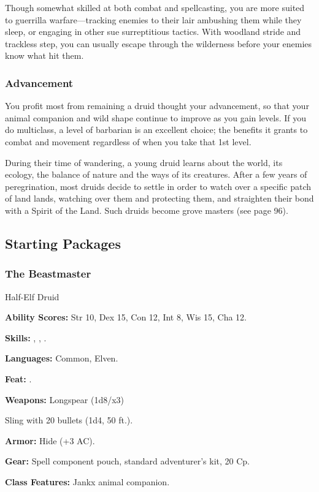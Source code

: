 Though somewhat skilled at both combat and spellcasting, you are more suited to guerrilla warfare---tracking enemies to their lair ambushing them while they sleep, or engaging in other sue surreptitious tactics. With woodland stride and trackless step, you can usually escape through the wilderness before your enemies know what hit them.

\subsubsection{Advancement}

You profit most from remaining a druid thought your advancement, so that your animal companion and wild shape continue to improve as you gain levels. If you do multiclass, a level of barbarian is an excellent choice; the benefits it grants to combat and movement regardless of when you take that 1st level.

During their time of wandering, a young druid learns about the world, its ecology, the balance of nature and the ways of its creatures. After a few years of peregrination, most druids decide to settle in order to watch over a specific patch of land lands, watching over them and protecting them, and straighten their bond with a Spirit of the Land. Such druids become grove masters (see page 96).

\subsection{Starting Packages}
\subsubsection{The Beastmaster}

Half-Elf Druid

\textbf{Ability Scores:} Str 10, Dex 15, Con 12, Int 8, Wis 15, Cha 12.

\textbf{Skills:} , , .

\textbf{Languages:} Common, Elven.

\textbf{Feat:} .

\textbf{Weapons:} Longspear (1d8/x3)

Sling with 20 bullets (1d4, 50 ft.).

\textbf{Armor:} Hide (+3 AC).

\textbf{Gear:} Spell component pouch, standard adventurer's kit, 20 Cp.

\textbf{Class Features:} Jankx animal companion.

